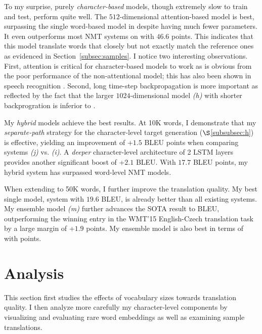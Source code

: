 To my surprise, purely {\it character-based} models, though extremely slow to
train and test, perform quite well. The $512$-dimensional attention-based model \modelchar{} is
best, surpassing the single word-based model in
\cite{jean15wmt} despite having much fewer parameters. It even outperforms most NMT
systems  
on \chr{} with $46.6$ points. This indicates that this model translate words that closely but
not exactly match the reference ones as evidenced in
Section~\ref{subsec:samples}. 
I notice two interesting observations. First,
attention is critical for character-based models to work as is obvious from the
poor performance of the non-attentional model; this has also been shown in speech
recognition \cite{chan16}. Second, long time-step backpropagation is more important
as reflected by the fact that the larger $1024$-dimensional model {\it (h)} with shorter
backprogration is inferior to \modelchar{}. 

My {\it hybrid} models achieve the best results. 
At 10K words, I demonstrate that my {\it
separate-path} strategy for the character-level target generation
($\S$\ref{subsubsec:h}) is effective, yielding an improvement of +$1.5$ BLEU
points when comparing systems {\it (j)} vs. {\it (i)}. A {\it deeper} character-level architecture of 2 LSTM
layers provides another significant
boost of +$2.1$ BLEU.
With $17.7$ BLEU points, my hybrid system \modelsmall{} has
surpassed word-level NMT models.

When extending to 50K words, I further improve the translation quality.
My best single model, system \model{} with $19.6$ BLEU, is already better than all
existing systems.
My ensemble model {\it (m)} further advances the SOTA
result to \biformat{\ensbleu} BLEU, outperforming
the winning entry in the WMT'15 English-Czech translation task by a large margin
of +$1.9$ points. My ensemble model is also best in terms of \chr{} with  points.

\section{Analysis}
\label{sec:analysis}
This section first studies the effects of vocabulary sizes towards
translation quality. I then analyze more carefully 
my character-level components by visualizing and evaluating rare word
embeddings as well as examining sample translations.

